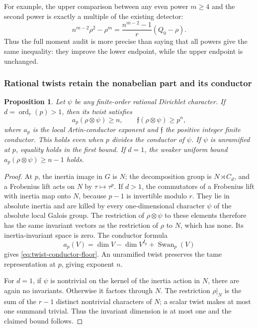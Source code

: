 \documentclass[11pt]{article}
\newtheorem{proposition}[theorem]{Proposition}
\theoremstyle{definition}
\theoremstyle{remark}
\begin{document}
For example, the upper comparison between any even power \(m\geq4\)
and the second power is exactly a multiple of the existing detector:
\[
 n^{m-2}\rho^2-\rho^m
 =\frac{n^{m-2}-1}{r}(Q_0-\rho).
\]
Thus the full moment audit is more precise than saying that all powers
give the same inequality: they improve the lower endpoint, while
the upper endpoint is unchanged.

\subsubsection{Rational twists retain the nonabelian part and its conductor}

\begin{proposition}\label{prop:rational-twist-conductor}
Let \(\psi\) be any finite-order rational Dirichlet character.
If \(d=\operatorname{ord}_r(p)>1\), then its twist satisfies
\begin{equation}\label{eq:twist-conductor-floor}
 a_p(\rho\otimes\psi)\geq n,
 \qquad \mathfrak f(\rho\otimes\psi)\geq p^n,
\end{equation}
where \(a_p\) is the local Artin-conductor exponent and
\(\mathfrak f\) the positive integer finite conductor.
This holds even when \(p\) divides the conductor of \(\psi\).
If \(\psi\) is unramified at \(p\), equality holds in the first bound.
If \(d=1\), the weaker uniform bound \(a_p(\rho\otimes\psi)\geq n-1\)
holds.
\end{proposition}

\begin{proof}
At \(p\), the inertia image in \(G\) is \(N\); the decomposition group
is \(N\rtimes C_d\), and a Frobenius lift acts on \(N\) by
\(\tau\mapsto\tau^p\). If \(d>1\), the commutators of a Frobenius lift
with inertia map onto \(N\), because \(p-1\) is invertible modulo \(r\).
They lie in absolute inertia and are killed by every one-dimensional
character \(\psi\) of the absolute local Galois group.
The restriction of \(\rho\otimes\psi\) to these elements therefore
has the same invariant vectors as the restriction of \(\rho\) to
\(N\), which has none. Its inertia-invariant space is zero.
The conductor formula
\[
 a_p(V)=\dim V-\dim V^{I_p}+\operatorname{Swan}_p(V)
\]
gives \eqref{eq:twist-conductor-floor}. An unramified twist preserves
the tame representation at \(p\), giving exponent \(n\).

For \(d=1\), if \(\psi\) is nontrivial on the kernel of the inertia
action in \(N\), there are again no invariants. Otherwise it factors
through \(N\). The restriction
\(\rho|_N\) is the sum of the \(r-1\) distinct nontrivial characters
of \(N\); a scalar twist makes at most one summand trivial.
Thus the invariant dimension is at most one and the claimed
bound follows.
\end{proof}
\end{document}
